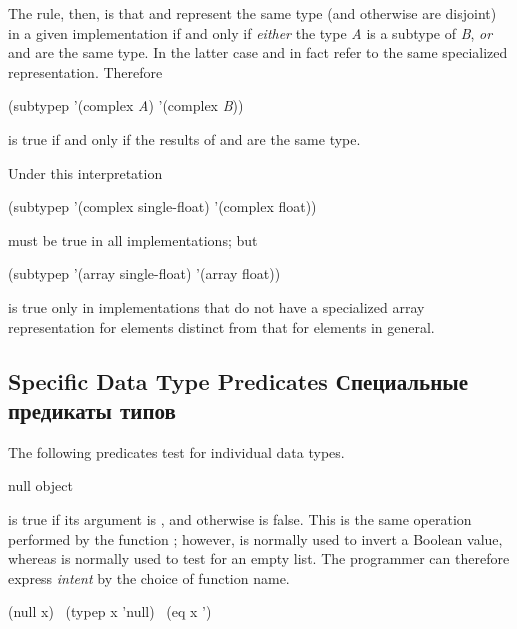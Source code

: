 \begin{defun}[Function]
\begin{new}
The rule, then, is that 
and  represent the same type (and otherwise are disjoint)
in a given implementation
if and only if \emph{either} the type \emph{A} is a subtype of \emph{B}, \emph{or}
 and
 are the same type.
In the latter case 
and  in fact refer to the same specialized representation.
Therefore
\begin{lisp}
(subtypep '(complex \emph{A}) '(complex \emph{B}))
\end{lisp}
is true if and only if the results of
 and
 are the same type.

Under this interpretation
\begin{lisp}
(subtypep '(complex single-float) '(complex float))
\end{lisp}
must be true in all implementations; but
\begin{lisp}
(subtypep '(array single-float) '(array float))
\end{lisp}
is true only in implementations that do not have a specialized array representation
for  elements distinct from that for  elements in
general.
\end{new}
\end{defun}

\subsection{Specific Data Type Predicates Специальные предикаты типов}

The following predicates test for individual data types.

\begin{defun}[Function]
null object

 is true if its argument is {\emptylist},
and otherwise is false.
This is the same operation performed by the function ;
however,  is normally used to invert a Boolean value,
whereas  is normally used to test for an empty list.  The programmer
can therefore express \emph{intent} by the choice of function name.
\begin{lisp}
(null x) \EQ\ (typep x 'null) \EQ\ (eq x '{\emptylist})
\end{lisp}
\end{defun}

